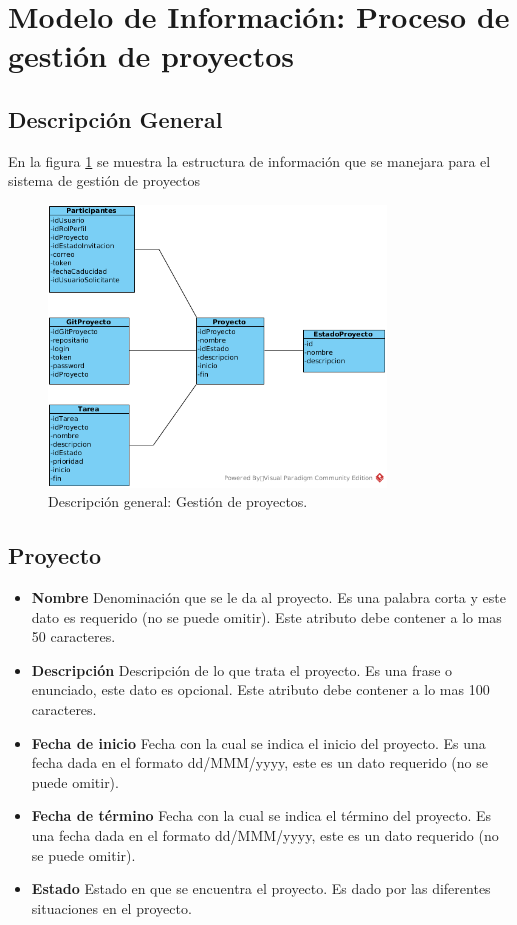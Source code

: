 \section{Modelo de Información: Proceso de gestión de proyectos}


\subsection{Descripción General}
En la figura \ref{fig:MOD01} se muestra la estructura de información que se manejara para el sistema de gestión de proyectos

\begin{figure}[htb]
\centering
\includegraphics[width=0.8\textwidth]{./images/Modelo_Gestion_Proyectos.png}
\caption{Descripción general: Gestión de proyectos.} \label{fig:MOD01}
\end{figure}

\newpage

\subsection{Proyecto}

\begin{itemize}
	\item \textbf{Nombre} Denominación que se le da al proyecto. Es una palabra corta y este dato es requerido (no se puede omitir). Este atributo debe contener a lo mas 50 caracteres.
	\item \textbf{Descripción} Descripción de lo que trata el proyecto. Es una frase o enunciado, este dato es opcional. Este atributo debe contener a lo mas 100 caracteres.
	\item \textbf{Fecha de inicio} Fecha con la cual se indica el inicio del proyecto. Es una fecha dada en el formato dd/MMM/yyyy, este es un dato requerido (no se puede omitir).
	\item \textbf{Fecha de término} Fecha con la cual se indica el término del proyecto. Es una fecha dada en el formato dd/MMM/yyyy, este es un dato requerido (no se puede omitir).
	\item \textbf{Estado} Estado en que se encuentra el proyecto. Es dado por las diferentes situaciones en el proyecto.
\end{itemize}

